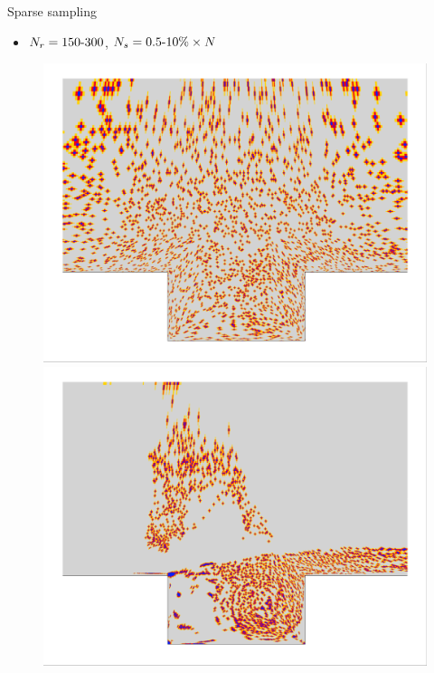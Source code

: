 \documentclass[]{beamer}
\begin{document}
\begin{frame}{Sparse sampling}
	\begin{itemize}
		\item $N_r = 150\text{-}300$, $N_s = 0.5\text{-}10\% \times N$
	\end{itemize}
	\begin{figure}
		\begin{minipage}{0.49\linewidth}
			\centering
			\includegraphics[width=0.63\linewidth,trim={0.5em 0.5em 0.5em 0.5em},clip]{Images/experiments/2d_cavity/iblank/iBlank_random_zoom.png}
		\end{minipage}
		\begin{minipage}{0.49\linewidth}
			\centering
			\includegraphics[width=0.63\linewidth,trim={0.5em 0.5em 0.5em 0.5em},clip]{Images/experiments/2d_cavity/iblank/iBlank_eigenvec_zoom.png}
		\end{minipage}
	

\end{figure}
\end{frame}
\end{document}
